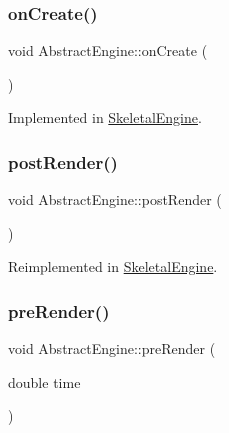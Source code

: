 \hypertarget{class_ori_engine_1_1_abstract_engine_a7359c90344c928e283d177159780646e}{}\label{class_ori_engine_1_1_abstract_engine_a7359c90344c928e283d177159780646e} 
\subsubsection{\texorpdfstring{on\+Create()}{onCreate()}}
{\footnotesize\ttfamily void Abstract\+Engine\+::on\+Create (\begin{DoxyParamCaption}{ }\end{DoxyParamCaption})\hspace{0.3cm}{\ttfamily [pure virtual]}}



Implemented in \hyperlink{class_skeletal_engine_aa947bae905c4e4628bfe5036b4943a08}{Skeletal\+Engine}.

\hypertarget{class_ori_engine_1_1_abstract_engine_a12ce6df5383341e36fd674a5e026bf3f}{}\label{class_ori_engine_1_1_abstract_engine_a12ce6df5383341e36fd674a5e026bf3f} 
\subsubsection{\texorpdfstring{post\+Render()}{postRender()}}
{\footnotesize\ttfamily void Abstract\+Engine\+::post\+Render (\begin{DoxyParamCaption}{ }\end{DoxyParamCaption})\hspace{0.3cm}{\ttfamily [virtual]}}



Reimplemented in \hyperlink{class_skeletal_engine_a58981a23dad5e0bf14aadede98bba12f}{Skeletal\+Engine}.

\hypertarget{class_ori_engine_1_1_abstract_engine_a132e10c2452afe2d555ac85ea1b48845}{}\label{class_ori_engine_1_1_abstract_engine_a132e10c2452afe2d555ac85ea1b48845} 
\subsubsection{\texorpdfstring{pre\+Render()}{preRender()}}
{\footnotesize\ttfamily void Abstract\+Engine\+::pre\+Render (\begin{DoxyParamCaption}\item[{double}]{time }\end{DoxyParamCaption})\hspace{0.3cm}{\ttfamily [virtual]}}




